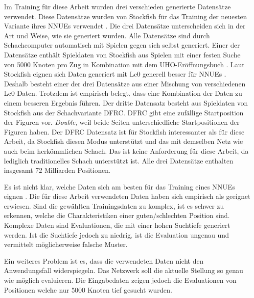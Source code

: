 Im Training für diese Arbeit wurden drei verschieden generierte Datensätze verwendet. Diese Datensätze wurden von Stockfish für das Training der neuesten Variante ihres \acp{NNUE} verwendet \cite{StockfishNewestNetJul04}. Die drei Datensätze unterscheiden sich in der Art und Weise, wie sie generiert wurden. Alle Datensätze sind durch Schachcomputer automatisch mit Spielen gegen sich selbst generiert. Einer der Datensätze enthält Spieldaten von Stockfish aus Spielen mit einer festen Suche von 5000 Knoten pro Zug in Kombination mit dem \ac{UHO}-Eröffnungsbuch \cite{Pohl2021}. Laut Stockfish eignen sich Daten generiert mit \ac{Lc0} generell besser für \acp{NNUE} \cite{StockfishTrainingDataWiki}. Deshalb besteht einer der drei Datensätze aus einer Mischung von verschiedenen \ac{Lc0} Daten. Trotzdem ist empirisch belegt, dass eine Kombination der Daten zu einem besseren Ergebnis führen. Der dritte Datensatz besteht aus Spieldaten von Stockfish aus der Schachvariante \ac{DFRC}. \ac{DFRC} gibt eine zufällige Startposition der Figuren vor. \emph{Double}, weil beide Seiten unterschiedliche Startpositionen der Figuren haben. Der \ac{DFRC} Datensatz ist für Stockfish interessanter als für diese Arbeit, da Stockfish diesen Modus unterstützt und das mit demselben Netz wie auch beim herkömmlichen Schach. Das ist keine Anforderung für diese Arbeit, da lediglich traditionelles Schach unterstützt ist. Alle drei Datensätze enthalten insgesamt 72 Milliarden Positionen.

Es ist nicht klar, welche Daten sich am besten für das Training eines \acp{NNUE} eignen \cite{StockfishNNUE}. Die für diese Arbeit verwendeten Daten haben sich empirisch als geeignet erwiesen. Sind die gewählten Trainingsdaten zu komplex, ist es schwer zu erkennen, welche die Charakteristiken einer guten/schlechten Position sind. Komplexe Daten sind Evaluationen, die mit einer hohen Suchtiefe generiert werden. Ist die Suchtiefe jedoch zu niedrig, ist die Evaluation ungenau und vermittelt möglicherweise falsche Muster.

Ein weiteres Problem ist es, dass die verwendeten Daten nicht den Anwendungsfall widerspiegeln. Das Netzwerk soll die aktuelle Stellung so genau wie möglich evaluieren. Die Eingabedaten zeigen jedoch die Evaluationen von Positionen welche \zb{} nur 5000 Knoten tief gesucht wurden.

